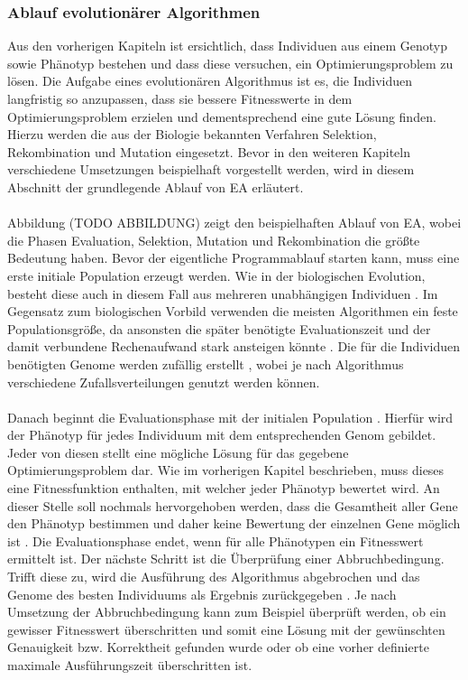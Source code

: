 \subsubsection{Ablauf evolutionärer Algorithmen}
Aus den vorherigen Kapiteln ist ersichtlich, dass Individuen aus einem Genotyp sowie Phänotyp bestehen und dass diese versuchen, ein Optimierungsproblem zu lösen. Die Aufgabe eines evolutionären Algorithmus ist es, die Individuen langfristig so anzupassen, dass sie bessere Fitnesswerte in dem Optimierungsproblem erzielen und dementsprechend eine gute Lösung finden. Hierzu werden die aus der Biologie bekannten Verfahren Selektion, Rekombination und Mutation eingesetzt. Bevor in den weiteren Kapiteln verschiedene Umsetzungen beispielhaft vorgestellt werden, wird in diesem Abschnitt der grundlegende Ablauf von \ac{EA} erläutert.
\\\\
Abbildung (TODO ABBILDUNG) zeigt den beispielhaften Ablauf von \ac{EA}, wobei die Phasen Evaluation, Selektion, Mutation und Rekombination die größte Bedeutung haben. Bevor der eigentliche Programmablauf starten kann, muss eine erste initiale Population erzeugt werden. Wie in der biologischen Evolution, besteht diese auch in diesem Fall aus mehreren unabhängigen Individuen \cite{rothlauf2006representation}. Im Gegensatz zum biologischen Vorbild verwenden die meisten Algorithmen ein feste Populationsgröße, da ansonsten die später benötigte Evaluationszeit und der damit verbundene Rechenaufwand stark ansteigen könnte \cite{rothlauf2006representation}. Die für die Individuen benötigten Genome werden zufällig erstellt \cite{weicker2015evolutionare}, wobei je nach Algorithmus verschiedene Zufallsverteilungen genutzt werden können.
\\\\
Danach beginnt die Evaluationsphase mit der initialen Population \cite{rothlauf2006representation}. Hierfür wird der Phänotyp für jedes Individuum mit dem entsprechenden Genom gebildet. Jeder von diesen stellt eine mögliche Lösung für das gegebene Optimierungsproblem dar. Wie im vorherigen Kapitel beschrieben, muss dieses eine Fitnessfunktion enthalten, mit welcher jeder Phänotyp bewertet wird. An dieser Stelle soll nochmals hervorgehoben werden, dass die Gesamtheit aller Gene den Phänotyp bestimmen und daher keine Bewertung der einzelnen Gene möglich ist \cite{rothlauf2006representation}. Die Evaluationsphase endet, wenn für alle Phänotypen ein Fitnesswert ermittelt ist. Der nächste Schritt ist die Überprüfung einer Abbruchbedingung. Trifft diese zu, wird die Ausführung des Algorithmus abgebrochen und das Genome des besten Individuums als Ergebnis zurückgegeben \cite{weicker2015evolutionare}. Je nach Umsetzung der Abbruchbedingung kann zum Beispiel überprüft werden, ob ein gewisser Fitnesswert überschritten und somit eine Lösung mit der gewünschten Genauigkeit bzw. Korrektheit gefunden wurde oder ob eine vorher definierte maximale Ausführungszeit überschritten ist.
